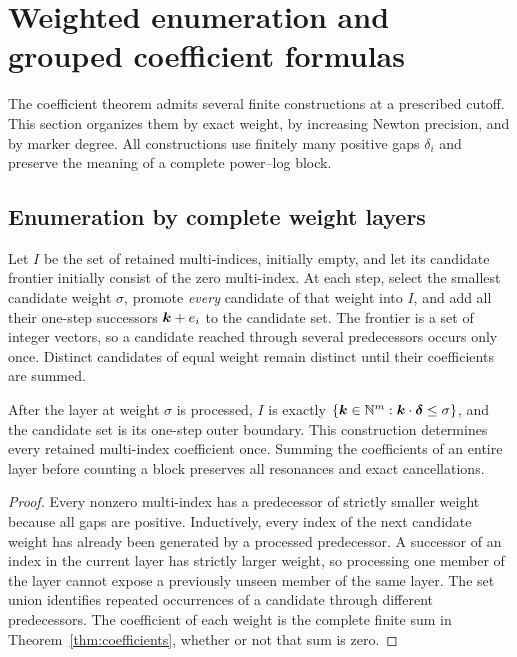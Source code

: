 \section{Weighted enumeration and grouped coefficient formulas}
\label{sec:incremental}

The coefficient theorem admits several finite constructions at a prescribed cutoff. This section organizes them by exact weight, by increasing Newton precision, and by marker degree. All constructions use finitely many positive gaps $\delta_i$ and preserve the meaning of a complete power--log block.

\subsection{Enumeration by complete weight layers}

Let $I$ be the set of retained multi-indices, initially empty, and let its
candidate frontier initially consist of the zero multi-index. At each step,
select the smallest candidate weight $\sigma$, promote \emph{every} candidate
of that weight into $I$, and add all their one-step successors
$\boldsymbol k+e_i$ to the candidate set. The frontier is a set of integer vectors, so a candidate reached through several predecessors occurs only once. Distinct candidates of equal weight remain distinct until their coefficients are summed.

\begin{proposition}
After the layer at weight $\sigma$ is processed, $I$ is exactly
$\{\boldsymbol k\in\mathbb N^m:\boldsymbol k\cdot\boldsymbol\delta\le\sigma\}$, and the candidate set is its
one-step outer boundary. This construction determines every retained multi-index coefficient once. Summing the coefficients of an entire layer before
counting a block preserves all resonances and exact cancellations.
\end{proposition}
\begin{proof}
Every nonzero multi-index has a predecessor of strictly smaller weight because
all gaps are positive. Inductively, every index of the next candidate weight
has already been generated by a processed predecessor. A successor of an index
in the current layer has strictly larger weight, so processing one member of
the layer cannot expose a previously unseen member of the same layer.
The set union identifies repeated occurrences of a candidate through different predecessors. The
coefficient of each weight is the complete finite sum in
Theorem~\ref{thm:coefficients}, whether or not that sum is zero.
\end{proof}

